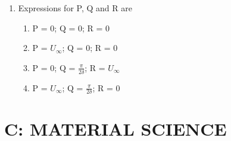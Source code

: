 \documentclass[a4paper,10pt]{article}
\begin{document}
\begin{enumerate}
\item Expressions for P, Q and R are
\hfill{}

\begin{multicols}{2}
\begin{enumerate}
\item P = 0; Q = 0; R = 0
\item P = $U_\infty$; Q = 0; R = 0
\item P = 0; Q = $\frac{\pi}{2\delta}$; R = $U_\infty$
\item P = $U_\infty$; Q = $\frac{\pi}{2\delta}$; R = 0
\end{enumerate}
\end{multicols}
\end{enumerate}

\newpage

\section*{C: MATERIAL SCIENCE}
\end{document}
